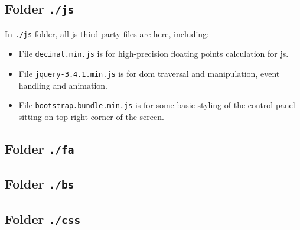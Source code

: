 \subsection{Folder \texttt{./js}}

In \texttt{./js} folder, all \gls{js} third-party files are here, including:

\begin{itemize}
    \item File \texttt{decimal.min.js} is for high-precision floating points calculation for \glsdesc{js}.
    \item File \texttt{jquery-3.4.1.min.js} is for \gls{dom} traversal and manipulation, event handling and animation.
    \item File \texttt{bootstrap.bundle.min.js} is for some basic styling of the control panel sitting on top right corner of the screen.
\end{itemize}

\subsection{Folder \texttt{./fa}}

\subsection{Folder \texttt{./bs}}

\subsection{Folder \texttt{./css}}